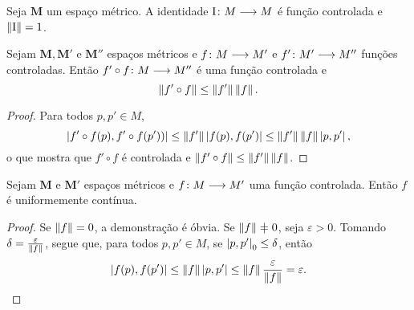 %

\begin{exercise}
Seja $\bm M$ um espaço métrico. A identidade ${\mathrm{I}}\colon {M} \longrightarrow {M}$ é função controlada e $\left\Vert{\mathrm{I}}\right\Vert=1$.
\end{exercise}

\begin{proposition}
\label{prop:composicao.controlada}
Sejam $\bm M, \bm M'$ e $\bm M''$ espaços métricos e ${f}\colon {M} \longrightarrow {M'}$ e ${f'}\colon {M'} \longrightarrow {M''}$ funções controladas. Então ${f' \circ f}\colon {M} \longrightarrow {M''}$ é uma função controlada e
	\begin{equation*}
		\left\Vert{f' \circ f}\right\Vert \leq \left\Vert{f'}\right\Vert\left\Vert{f}\right\Vert.
	\end{equation*}
\end{proposition}
\begin{proof}
Para todos $p,p' \in M$,
	\begin{equation*}
	\left\vert{f' \circ f(p)},{f' \circ f(p'))}\right\vert \leq \left\Vert{f'}\right\Vert \left\vert{f(p)},{f(p')}\right\vert \leq \left\Vert{f'}\right\Vert\left\Vert{f}\right\Vert\left\vert{p},{p'}\right\vert,
	\end{equation*}
o que mostra que $f' \circ f$ é controlada e $\left\Vert{f' \circ f}\right\Vert \leq \left\Vert{f'}\right\Vert\left\Vert{f}\right\Vert$.
\end{proof}

\begin{proposition}
\label{prop:continuidade.controlada}
Sejam $\bm M$ e $\bm M'$ espaços métricos e ${f}\colon {M} \longrightarrow {M'}$ uma função controlada. Então $f$ é uniformemente contínua.
\end{proposition}
\begin{proof}
Se $\left\Vert{f}\right\Vert=0$, a demonstração é óbvia. Se $\distor{f} \neq 0$, seja $\varepsilon>0$. Tomando $\delta=\frac{\varepsilon}{\left\Vert{f}\right\Vert}$, segue que, para todos $p,p' \in M$, se $\left\vert{p},{p'}\right\vert_0 \leq \delta$, então
	\begin{equation*}
	\left\vert{f(p)},{f(p')}\right\vert \leq \left\Vert{f}\right\Vert\left\vert{p},{p'}\right\vert \leq \left\Vert{f}\right\Vert\frac{\varepsilon}{\left\Vert{f}\right\Vert} = \varepsilon.
	\qedhere
	\end{equation*}
\end{proof}

